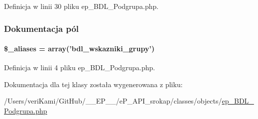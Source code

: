 Definicja w linii 30 pliku ep\-\_\-\-B\-D\-L\-\_\-\-Podgrupa.\-php.



\subsubsection{Dokumentacja pól}
\hypertarget{classep___b_d_l___grupa_ab4e31d75f0bc5d512456911e5d01366b}{
\paragraph[{\$\-\_\-aliases}]{\setlength{\rightskip}{0pt plus 5cm}\$\-\_\-aliases = array('bdl\-\_\-wskazniki\-\_\-grupy')}}\label{classep___b_d_l___grupa_ab4e31d75f0bc5d512456911e5d01366b}


Definicja w linii 4 pliku ep\-\_\-\-B\-D\-L\-\_\-\-Podgrupa.\-php.



Dokumentacja dla tej klasy została wygenerowana z pliku\-:\begin{DoxyCompactItemize}
\item 
/\-Users/veri\-Kami/\-Git\-Hub/\-\_\-\-\_\-\-E\-P\-\_\-\-\_\-/e\-P\-\_\-\-A\-P\-I\-\_\-srokap/classes/objects/\hyperlink{ep___b_d_l___podgrupa_8php}{ep\-\_\-\-B\-D\-L\-\_\-\-Podgrupa.\-php}\end{DoxyCompactItemize}
